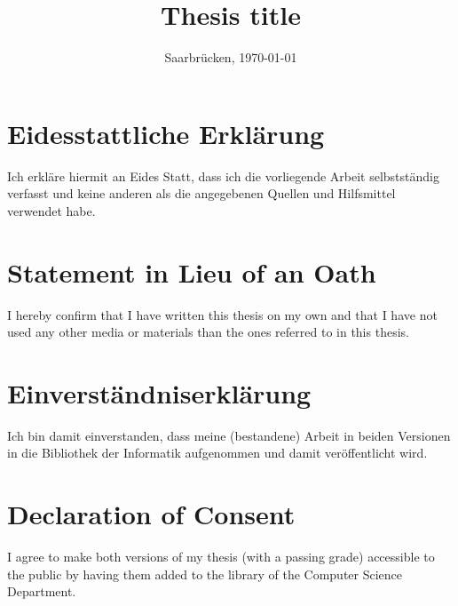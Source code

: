 \documentclass[11pt, a4paper, twoside]{Thesis}
\begin{document}


\frontmatter

\title  {Thesis title}

\addresses  {\groupname\\\deptname\\\univname}  %
\date       {Saarbr\"ucken, \today }
\subject    {}
\keywords   {}

\maketitle



\thispagestyle{empty}
\setcounter{tocdepth}{5}
\section*{Eidesstattliche Erkl\"{a}rung}
Ich erkl\"{a}re hiermit an Eides Statt, dass ich die vorliegende Arbeit selbstst\"{a}ndig verfasst und keine
anderen als die angegebenen Quellen und Hilfsmittel verwendet habe.

\vspace{0.60cm}
\section*{Statement in Lieu of an Oath}
I hereby confirm that I have written this thesis on my own and that I have not used any other media or
materials than the ones referred to in this thesis.
\vspace{1.5cm}

\section*{Einverst\"{a}ndniserkl\"{a}rung}
Ich bin damit einverstanden, dass meine (bestandene) Arbeit in beiden Versionen in die Bibliothek der
Informatik aufgenommen und damit ver\"{o}ffentlicht wird.

\vspace{0.60cm}
\section*{Declaration of Consent}
I agree to make both versions of my thesis (with a passing grade) accessible to the public by having
them added to the library of the Computer Science Department.
\vspace{3cm}
\end{document}
